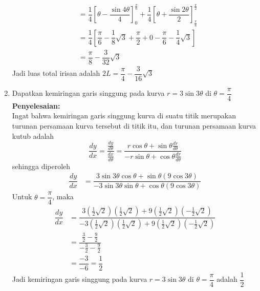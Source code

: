 \documentclass{article}
\begin{document}
\begin{enumerate}
\begin{align*}
	&= \dfrac{1}{4}\left[\theta -\dfrac{\sin 4\theta}{4}\right]_0^\frac{\pi}{6} + \dfrac{1}{4}\left[\theta+\dfrac{\sin 2\theta}{2}\right]_\frac{\pi}{6}^\frac{\pi}{2}\\
	&= \dfrac{1}{4}\left[\dfrac{\pi}{6}-\dfrac{1}{8}\sqrt{3}+\dfrac{\pi}{2}+0-\dfrac{\pi}{6}-\dfrac{1}{4}\sqrt{3}\right]\\
	&= \dfrac{\pi}{8}-\dfrac{3}{32}\sqrt{3}
	\end{align*}
	Jadi luas total irisan adalah $2L=\dfrac{\pi}{4}-\dfrac{3}{16}\sqrt{3}$
	\item Dapatkan kemiringan garis singgung pada kurva $r=3\sin 3\theta$ di $\theta=\dfrac{\pi}{4}$\\
	\textbf{Penyelesaian:}\\
	Ingat bahwa kemiringan garis singgung kurva di suatu titik merupakan turunan persamaan kurva tersebut di titik itu, dan turunan persamaan kurva kutub adalah
	$$ \dfrac{dy}{dx} = \dfrac{\frac{dy}{d\theta}}{\frac{dx}{d\theta}} = \dfrac{r\cos\theta +\sin\theta \frac{dr}{d\theta}}{-r\sin\theta+\cos\theta \frac{dr}{d\theta}} $$
	sehingga diperoleh 
	\begin{align*}
	\dfrac{dy}{dx} &= \dfrac{3\sin 3\theta \cos \theta+\sin \theta (9\cos 3\theta)}{-3\sin 3\theta\sin\theta +\cos\theta (9\cos 3\theta)}
	\end{align*}
	Untuk $\theta=\dfrac{\pi}{4}$, maka 
	\begin{align*}
	\dfrac{dy}{dx} &= \dfrac{3\left( \frac{1}{2}\sqrt{2}\right)\left( \frac{1}{2}\sqrt{2}\right)+9\left( \frac{1}{2}\sqrt{2}\right) \left(-\frac{1}{2}\sqrt{2}\right)}{-3\left(\frac{1}{2}\sqrt{2}\right)\left(\frac{1}{2}\sqrt{2}\right)+9\left(\frac{1}{2}\sqrt{2}\right)\left(-\frac{1}{2}\sqrt{2}\right)}\\
	&= \dfrac{\frac{3}{2}-\frac{9}{2}}{-\frac{3}{2}-\frac{9}{2}}\\
	&= \dfrac{-3}{-6} = \dfrac{1}{2}
	\end{align*}
	Jadi kemiringan garis singgung pada kurva $r=3\sin 3\theta$ di $\theta=\dfrac{\pi}{4}$ adalah $\dfrac{1}{2}$
\end{enumerate}
\end{document}
